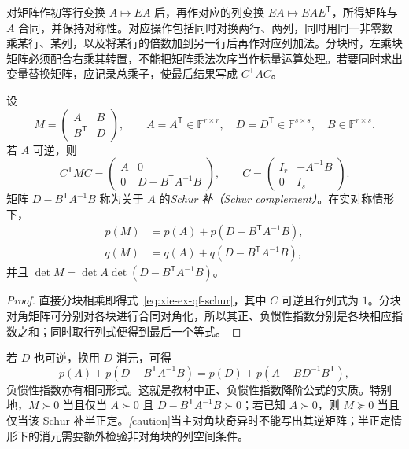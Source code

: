 对矩阵作初等行变换 $A\mapsto EA$ 后，再作对应的列变换 $EA\mapsto EAE^{\mathsf T}$，所得矩阵与 $A$ 合同，并保持对称性。对应操作包括同时对换两行、两列，同时用同一非零数乘某行、某列，以及将某行的倍数加到另一行后再作对应列加法。分块时，左乘块矩阵必须配合右乘其转置，不能把矩阵乘法次序当作标量运算处理。若要同时求出变量替换矩阵，应记录总乘子，使最后结果写成 $C^{\mathsf T}AC$。

\begin{theorem}[对称分块消元]
\label{thm:xie-ex-qf-schur}
设
\[
 M=\begin{pmatrix}A&B\\B^{\mathsf T}&D\end{pmatrix},\qquad
 A=A^{\mathsf T}\in\mathbb F^{r\times r},\quad
 D=D^{\mathsf T}\in\mathbb F^{s\times s},\quad B\in\mathbb F^{r\times s}.
\]
若 $A$ 可逆，则
\begin{equation}
 C^{\mathsf T}MC=
 \begin{pmatrix}A&0\\0&D-B^{\mathsf T}A^{-1}B\end{pmatrix},
 \qquad C=\begin{pmatrix}I_r&-A^{-1}B\\0&I_s\end{pmatrix}.
 \label{eq:xie-ex-qf-schur}
\end{equation}
矩阵 $D-B^{\mathsf T}A^{-1}B$ 称为关于 $A$ 的\emph{Schur 补（Schur complement）}。在实对称情形下，
\begin{align}
 p(M)&=p(A)+p(D-B^{\mathsf T}A^{-1}B),\\
 q(M)&=q(A)+q(D-B^{\mathsf T}A^{-1}B),
 \label{eq:xie-ex-qf-schur-inertia}
\end{align}
并且 $\det M=\det A\det(D-B^{\mathsf T}A^{-1}B)$。
\end{theorem}
\begin{proof}
直接分块相乘即得式~\eqref{eq:xie-ex-qf-schur}，其中 $C$ 可逆且行列式为 $1$。分块对角矩阵可分别对各块进行合同对角化，所以其正、负惯性指数分别是各块相应指数之和；同时取行列式便得到最后一个等式。
\end{proof}

若 $D$ 也可逆，换用 $D$ 消元，可得
\[
 p(A)+p(D-B^{\mathsf T}A^{-1}B)
 =p(D)+p(A-BD^{-1}B^{\mathsf T}),
\]
负惯性指数亦有相同形式。这就是教材中正、负惯性指数降阶公式的实质。特别地，$M\succ0$ 当且仅当 $A\succ0$ 且 $D-B^{\mathsf T}A^{-1}B\succ0$；若已知 $A\succ0$，则 $M\succeq0$ 当且仅当该 Schur 补半正定。\emph[caution]{当主对角块奇异时不能写出其逆矩阵；半正定情形下的消元需要额外检验非对角块的列空间条件。}

